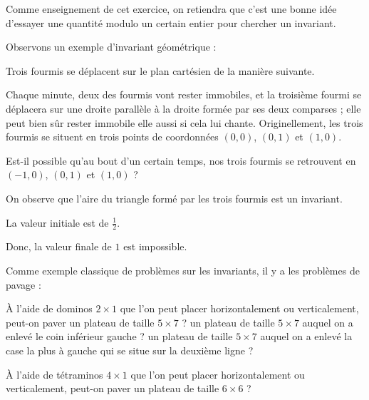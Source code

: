 Comme enseignement de cet exercice, on retiendra que c'est une bonne idée d'essayer une quantité modulo un certain entier pour chercher un invariant.

Observons un exemple d'invariant géométrique :

\begin{exo}
Trois fourmis se déplacent sur le plan cartésien de la manière suivante.

Chaque minute, deux des fourmis vont rester immobiles, et la troisième fourmi se déplacera sur une droite parallèle à la droite formée par ses deux comparses ; elle peut bien sûr rester immobile elle aussi si cela lui chante. Originellement, les trois fourmis se situent en trois points de coordonnées $(0, 0)$, $(0, 1)$ et $(1, 0)$.

Est-il possible qu'au bout d'un certain temps, nos trois fourmis se retrouvent en $(-1, 0)$, $(0, 1)$ et $(1, 0)$ ?
\end{exo}

\begin{sol}
On observe que l'aire du triangle formé par les trois fourmis est un invariant.

La valeur initiale est de $\frac 1 2$.

Donc, la valeur finale de $1$ est impossible.
\end{sol}


Comme exemple classique de problèmes sur les invariants, il y a les problèmes de pavage :

\begin{exo}
À l'aide de dominos $2 \times 1$ que l'on peut placer horizontalement ou verticalement, peut-on paver un plateau de taille $5 \times 7$ ? un plateau de taille $5\times7$ auquel on a enlevé le coin inférieur gauche ? un plateau de taille $5\times7$ auquel on a enlevé la case la plus à gauche qui se situe sur la deuxième ligne ?

À l'aide de tétraminos $4\times1$ que l'on peut placer horizontalement ou verticalement, peut-on paver un plateau de taille $6\times6$ ?
\end{exo}

